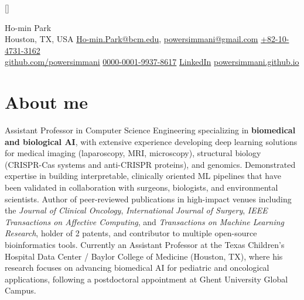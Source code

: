 \documentclass[11pt]{article}
\newcommand\ruleafter[1]{#1~\xrfill[.5ex]{1pt}[gr]}
\newif\ifRemVS
\begin{document}
[\global\RemVStrue]
\begin{center}
    {\fontsize{28}{28}\selectfont Ho-min Park} \\
    \bigskip
    {\color{icnclr}\faMapMarker} Houston, TX, USA \quad
    {\color{icnclr}\faEnvelope[regular]} \href{mailto:Ho-min.Park@bcm.edu}{Ho-min.Park@bcm.edu}, \href{mailto:powersimmani@gmail.com}{powersimmani@gmail.com}  \href{tel:+82-10-4731+3162}{+82-10-4731-3162}
    \\
    {\color{icnclr}\faGithub} \href{https://github.com/powersimmani}{github.com/powersimmani}
    \quad{\color{icnclr}\faOrcid} \href{https://orcid.org/0000-0001-9937-8617}{0000-0001-9937-8617}
    \quad{\color{icnclr}\faLinkedin} \href{https://www.linkedin.com/in/park-ho-min-b46658a6}{LinkedIn}
    \quad{\color{icnclr}\faGlobe} \href{https://powersimmani.github.io}{powersimmani.github.io}
\end{center}

\section{About me}
Assistant Professor in Computer Science Engineering specializing in \textbf{biomedical and biological AI}, with extensive experience developing deep learning solutions for medical imaging (laparoscopy, MRI, microscopy), structural biology (CRISPR-Cas systems and anti-CRISPR proteins), and genomics. Demonstrated expertise in building interpretable, clinically oriented ML pipelines that have been validated in collaboration with surgeons, biologists, and environmental scientists. Author of peer-reviewed publications in high-impact venues including the \textit{Journal of Clinical Oncology}, \textit{International Journal of Surgery}, \textit{IEEE Transactions on Affective Computing}, and \textit{Transactions on Machine Learning Research}, holder of 2 patents, and contributor to multiple open-source bioinformatics tools. Currently an Assistant Professor at the Texas Children's Hospital Data Center / Baylor College of Medicine (Houston, TX), where his research focuses on advancing biomedical AI for pediatric and oncological applications, following a postdoctoral appointment at Ghent University Global Campus.
\end{document}
